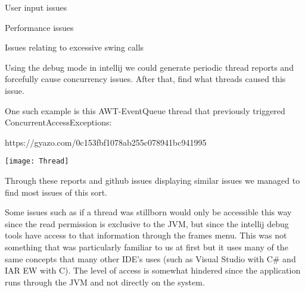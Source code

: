 \documentclass[]{article}
\begin{document}
User input issues

Performance issues

Issues relating to excessive swing calls

Using the debug mode in intellij we could generate periodic thread
reports and forcefully cause concurrency issues. After that, find what
threads caused this issue.

One such example is this AWT-EventQueue thread that previously triggered
ConcurrentAccessExceptions:

https://gyazo.com/0c153fbf1078ab255c078941bc941995

\begin{center}
\texttt{[image: Thread]}
\end{center}

Through these reports and github issues displaying similar issues we
managed to find most issues of this sort.

Some issues such as if a thread was stillborn would only be accessible
this way since the read permission is exclusive to the JVM, but since
the intellij debug tools have access to that information through the
frames menu. This was not something that was particularly familiar to us
at first but it uses many of the same concepts that many other IDE's
uses (such as Visual Studio with C\# and IAR EW with C). The level of
access is somewhat hindered since the application runs through the JVM
and not directly on the system.
\end{document}
